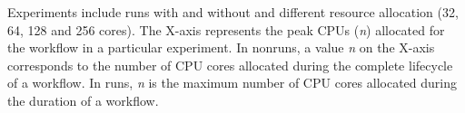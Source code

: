 Experiments include runs with and without \systemname and different
resource allocation (32, 64, 128 and 256 cores).
The X-axis represents the peak CPUs (\textit{n}) allocated for the
workflow in a particular experiment.  In non\systemname runs, a value
\textit{n} on the X-axis corresponds to the number of CPU cores
allocated during the complete lifecycle of a workflow. In \systemname
runs, \textit{n} is the maximum number of CPU cores allocated during
the duration of a workflow.





